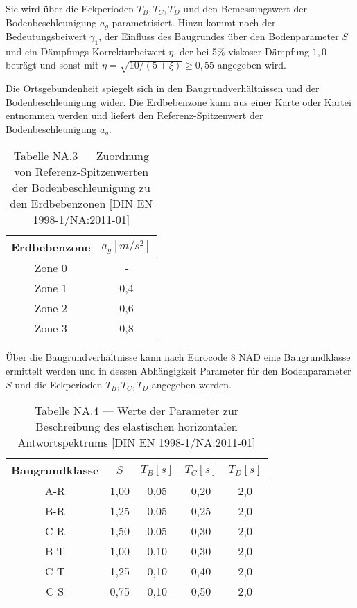 Sie wird über die Eckperioden $T_B, T_C, T_D$ und den Bemessungswert der Bodenbeschleunigung $a_g$ parametrisiert. Hinzu kommt noch der Bedeutungsbeiwert $\gamma_1$, der Einfluss des Baugrundes über den Bodenparameter $S$ und ein Dämpfungs-Korrekturbeiwert $\eta$, der bei 5\% viskoser Dämpfung $1,0$ beträgt und sonst mit $\eta=\sqrt{10/(5+\xi)}\geq 0,55$ angegeben wird.

Die Ortsgebundenheit spiegelt sich in den Baugrundverhältnissen und der Bodenbeschleunigung wider. Die Erdbebenzone kann aus einer Karte oder Kartei entnommen werden und liefert den Referenz-Spitzenwert der Bodenbeschleunigung $a_g$.

\begin{table}[H]
\centering
\begin{tabular}{ |c|c| } 
 \hline
 Erdbebenzone & $a_g [m/s^2]$ \\
 \hline\hline
 Zone 0 & - \\ 
 Zone 1 & 0,4 \\ 
 Zone 2 & 0,6 \\ 
 Zone 3 & 0,8 \\ 
 \hline
\end{tabular}
\caption{Tabelle NA.3 — Zuordnung von Referenz-Spitzenwerten der Bodenbeschleunigung zu den Erdbebenzonen [DIN EN 1998-1/NA:2011-01]}
\end{table}

Über die Baugrundverhältnisse kann nach Eurocode 8 NAD eine Baugrundklasse ermittelt werden und in dessen Abhängigkeit Parameter für den Bodenparameter $S$ und die Eckperioden $T_B, T_C, T_D$ angegeben werden.

\begin{table}[H]
\centering
\begin{tabular}{ |c|c|c|c|c| } 
 \hline
 Baugrundklasse & $S$ & $T_B [s]$ & $T_C [s]$ & $T_D [s]$\\
 \hline\hline
 A-R  & 1,00 & 0,05 & 0,20 & 2,0\\ 
 B-R  & 1,25 & 0,05 & 0,25 & 2,0\\ 
 C-R  & 1,50 & 0,05 & 0,30 & 2,0\\ 
 \hline
 B-T  & 1,00 & 0,10 & 0,30 & 2,0\\
 C-T  & 1,25 & 0,10 & 0,40 & 2,0\\
 \hline
 C-S  & 0,75 & 0,10 & 0,50 & 2,0\\
 \hline
\end{tabular}
\caption{Tabelle NA.4 — Werte der Parameter zur Beschreibung des elastischen horizontalen Antwortspektrums [DIN EN 1998-1/NA:2011-01]}
\end{table}

